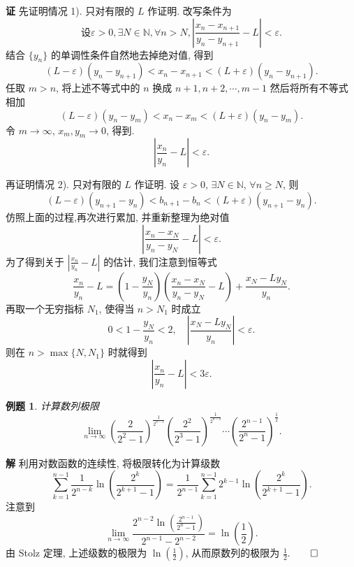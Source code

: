 \documentclass[12pt,a4paper,fontset=none]{ctexart}
\newcounter{theorem_counter}
\theoremstyle{bluehead}
\theoremstyle{greenhead}
\theoremstyle{yellowhead}
\theoremstyle{redhead}
\newtheorem{example}{例题}[subsection]
\begin{document}
\hspace{-2em}\textbf{证} \quad 先证明情况 1). 只对有限的 $L$ 作证明. 改写条件为
$$
\text{设} \varepsilon>0, \exists N \in \mathbb{N}, \forall n>N, \left|\frac{x_{n}-x_{n+1}}{y_{n}-y_{n+1}}-L\right|<\varepsilon.
$$
结合 $\{y_n\}$ 的单调性条件自然地去掉绝对值, 得到
$$
(L-\varepsilon)(y_{n}-y_{n+1})<x_{n}-x_{n+1}<(L+\varepsilon)(y_{n}-y_{n+1}).
$$
任取 $m>n$, 将上述不等式中的 $n$ 换成 $n+1, n+2, \cdots, m-1$ 然后将所有不等式相加 
$$
(L-\varepsilon)(y_{n}-y_{m})<x_{n}-x_{m}<(L+\varepsilon)(y_{n}-y_{m}).
$$
令 $m \to \infty$, $x_m, y_m \to 0$, 得到.
$$
\left|\frac{x_n}{y_n}-L\right|<\varepsilon.
$$

再证明情况 2). 只对有限的 $L$ 作证明. 设 $\varepsilon>0$, $\exists N \in \mathbb{N}$, $\forall n \ge N$, 则
$$(L-\varepsilon)(y_{n+1}-y_n)<b_{n+1}-b_n<(L+\varepsilon)(y_{n+1}-y_n).$$
仿照上面的过程,再次进行累加, 并重新整理为绝对值
$$
\left|\frac{x_{n}-x_{N}}{y_{n}-y_{N}}-L\right|<\varepsilon.
$$
为了得到关于 $\displaystyle \left|\frac{x_n}{y_n}-L\right|$ 的估计, 我们注意到恒等式
$$
\frac{x_n}{y_n}-L =  \left(1-\frac{y_N}{y_n}\right) \left(\frac{x_n-x_N}{y_n-y_N}-L\right) + \frac{x_N-Ly_N}{y_n}.
$$
再取一个无穷指标 $N_1$, 使得当 $n > N_1$ 时成立
$$
0<1-\frac{y_N}{y_n}<2, \quad \left|\frac{x_N-Ly_N}{y_n}\right|<\varepsilon.
$$
则在 $n > \max \{N,N_1\}$ 时就得到
\begin{equation*}
\left|\frac{x_n}{y_n}-L\right|<3\varepsilon.\tag*{\qed}
\end{equation*}

\begin{example}
  计算数列极限 
  $$
  \lim_{n \to \infty} \left(\frac{2}{2^2-1}\right)^{\frac{1}{2^{n-1}}} \left(\frac{2^2}{2^3-1}\right)^{\frac{1}{2^{n-2}}} \cdots \left(\frac{2^{n-1}}{2^n-1}\right)^{\frac{1}{2}}.
  $$
\end{example}

\hspace{-2em}\textbf{解} \quad 利用对数函数的连续性, 将极限转化为计算级数 
$$
\sum_{k=1}^{n-1} \frac{1}{2^{n-k}} \ln \left( \frac{2^k}{2^{k+1}-1} \right) = \frac{1}{2^{n-1}}\sum_{k=1}^{n-1} 2^{k-1} \ln \left(\frac{2^k}{2^{k+1}-1}\right).
$$
注意到
$$
\lim_{n \to \infty} \frac{2^{n-2}\ln\left(\frac{2^{n-1}}{2^n-1}\right)}{2^{n-1}-2^{n-2}}=\ln \left( \frac{1}{2} \right).
$$
由 Stolz 定理, 上述级数的极限为 $\displaystyle \ln \left( \frac{1}{2} \right)$, 从而原数列的极限为 $\displaystyle \frac{1}{2}$.\hfill\(\qed\)

\vspace{0.2cm}
\end{document}
